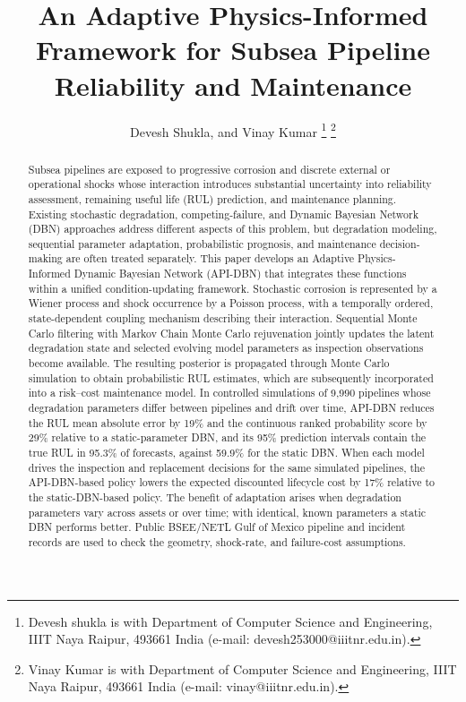\documentclass[journal]{IEEEtran}
\begin{document}
\title{An Adaptive Physics-Informed Framework for Subsea Pipeline Reliability and Maintenance}

\author{Devesh Shukla, and Vinay Kumar
\thanks{Devesh shukla is with Department of Computer Science and Engineering, IIIT Naya Raipur, 493661 India
(e-mail: devesh253000@iiitnr.edu.in).}
\thanks{Vinay Kumar is with Department of Computer Science and Engineering, IIIT Naya Raipur, 493661 India
(e-mail: vinay@iiitnr.edu.in).}}

\maketitle

\begin{abstract}
Subsea pipelines are exposed to progressive corrosion and discrete
external or operational shocks whose interaction introduces substantial
uncertainty into reliability assessment, remaining useful life (RUL)
prediction, and maintenance planning. Existing stochastic degradation,
competing-failure, and Dynamic Bayesian Network (DBN) approaches address
different aspects of this problem, but degradation modeling, sequential
parameter adaptation, probabilistic prognosis, and maintenance
decision-making are often treated separately. This paper develops an
Adaptive Physics-Informed Dynamic Bayesian Network (API-DBN) that
integrates these functions within a unified condition-updating
framework. Stochastic corrosion is represented by a Wiener process and
shock occurrence by a Poisson process, with a temporally ordered,
state-dependent coupling mechanism describing their interaction.
Sequential Monte Carlo filtering with Markov Chain Monte Carlo
rejuvenation jointly updates the latent degradation state and selected
evolving model parameters as inspection observations become available.
The resulting posterior is propagated through Monte Carlo simulation to
obtain probabilistic RUL estimates, which are subsequently incorporated
into a risk--cost maintenance model. In controlled simulations of
9{,}990 pipelines whose degradation parameters differ between pipelines
and drift over time, API-DBN reduces the RUL mean absolute error by
19\% and the continuous ranked probability score by 29\% relative to a
static-parameter DBN, and its 95\% prediction intervals contain the
true RUL in 95.3\% of forecasts, against 59.9\% for the static DBN.
When each model drives the inspection and replacement decisions for
the same simulated pipelines, the API-DBN-based policy lowers the
expected discounted lifecycle cost by 17\% relative to the
static-DBN-based policy. The benefit of adaptation arises when
degradation parameters vary across assets or over time; with identical,
known parameters a static DBN performs better. Public BSEE/NETL
Gulf of Mexico pipeline and incident records are used to check the
geometry, shock-rate, and failure-cost assumptions.
\end{abstract}
\end{document}
